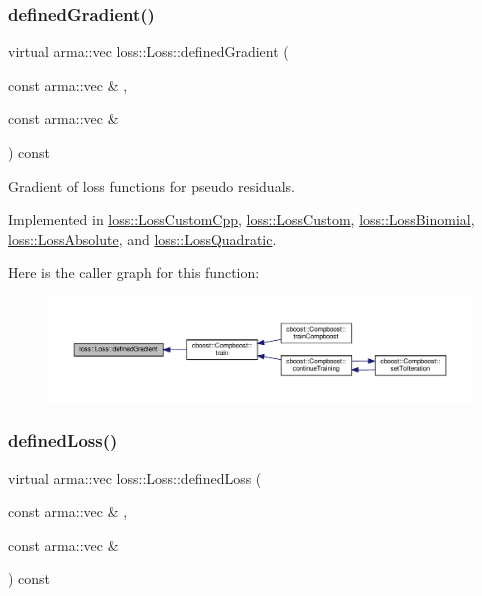 \subsubsection{\texorpdfstring{defined\+Gradient()}{definedGradient()}}
{\footnotesize\ttfamily virtual arma\+::vec loss\+::\+Loss\+::defined\+Gradient (\begin{DoxyParamCaption}\item[{const arma\+::vec \&}]{,  }\item[{const arma\+::vec \&}]{ }\end{DoxyParamCaption}) const\hspace{0.3cm}{\ttfamily [pure virtual]}}



Gradient of loss functions for pseudo residuals. 



Implemented in \hyperlink{classloss_1_1_loss_custom_cpp_a8db4924e9a9866c00adf4a8cfd3ec38a}{loss\+::\+Loss\+Custom\+Cpp}, \hyperlink{classloss_1_1_loss_custom_a91761ef42f85914dde2c3e6dd7fa1a0c}{loss\+::\+Loss\+Custom}, \hyperlink{classloss_1_1_loss_binomial_a68dcf02e90d09c3658733a9319a85f56}{loss\+::\+Loss\+Binomial}, \hyperlink{classloss_1_1_loss_absolute_a89e530450e42f20fc060ed9141fa8c04}{loss\+::\+Loss\+Absolute}, and \hyperlink{classloss_1_1_loss_quadratic_ad8b03123e260e2f034e507fff9695604}{loss\+::\+Loss\+Quadratic}.

Here is the caller graph for this function\+:
\nopagebreak
\begin{figure}[H]
\begin{center}
\leavevmode
\includegraphics[width=350pt]{classloss_1_1_loss_a267a4de70747ade4b2d84ce35a448979_icgraph}
\end{center}
\end{figure}
\mbox{\label{classloss_1_1_loss_ae9f94dd9b8311397583ba3a9cb485e94}} 
\subsubsection{\texorpdfstring{defined\+Loss()}{definedLoss()}}
{\footnotesize\ttfamily virtual arma\+::vec loss\+::\+Loss\+::defined\+Loss (\begin{DoxyParamCaption}\item[{const arma\+::vec \&}]{,  }\item[{const arma\+::vec \&}]{ }\end{DoxyParamCaption}) const\hspace{0.3cm}{\ttfamily [pure virtual]}}



